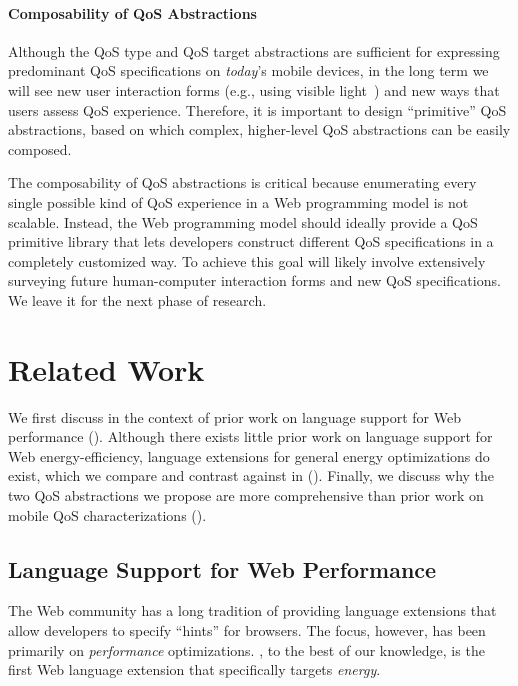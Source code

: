 \paragraph{Composability of QoS Abstractions} Although the QoS type and QoS target abstractions are sufficient for expressing predominant QoS specifications on \textit{today}'s mobile devices, in the long term we will see new user interaction forms (e.g., using visible light~\cite{license}) and new ways that users assess QoS experience. Therefore, it is important to design ``primitive'' QoS abstractions, based on which complex, higher-level QoS abstractions can be easily composed.

The composability of QoS abstractions is critical because enumerating every single possible kind of QoS experience in a Web programming model is not scalable. Instead, the Web programming model should ideally provide a QoS primitive library that lets developers construct different QoS specifications in a completely customized way. To achieve this goal will likely involve extensively surveying future human-computer interaction forms and new QoS specifications. We leave it for the next phase of research.

\section{Related Work}
\label{sec:lang:related}

We first discuss \greenweb in the context of prior work on language support for Web performance (). Although there exists little prior work on language support for Web energy-efficiency, language extensions for general energy optimizations do exist, which we compare and contrast \greenweb against in (). Finally, we discuss why the two QoS abstractions we propose are more comprehensive than prior work on mobile QoS characterizations ().

\subsection{Language Support for Web Performance}
\label{sec:lang:related:perf}

The Web community has a long tradition of providing language extensions that allow developers to specify ``hints'' for browsers. The focus, however, has been primarily on \textit{performance} optimizations. \greenweb, to the best of our knowledge, is the first Web language extension that specifically targets \textit{energy}.

